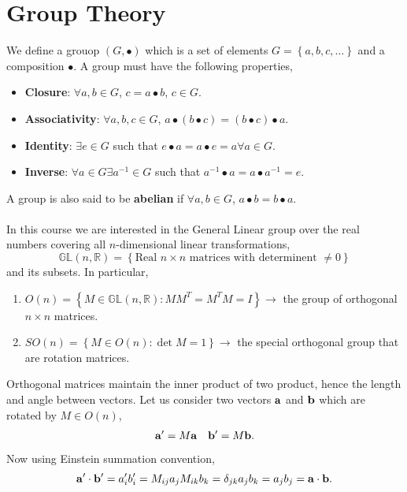 \documentclass{book}
\begin{document}
\section{Group Theory}
We define a grouop $(G, \bullet)$ which is a set of elements $G = \left\{a,b,c,\ldots\right\}$ and a composition $\bullet$. A group must have the following properties,
\begin{itemize}
	\item \textbf{Closure}: $\forall a,b \in G$, $c = a \bullet b$, $c \in G$.
	\item \textbf{Associativity}: $\forall a,b,c \in G$, $a \bullet(b \bullet c) = (b \bullet c) \bullet a$. 
	\item \textbf{Identity}: $\exists e \in G$ such that $e \bullet a = a \bullet e = a \forall a \in G$. 
	\item \textbf{Inverse}: $\forall a \in G \exists a^{-1} \in G$ such that $a^{-1}\bullet a = a \bullet a^{-1} = e$.
\end{itemize}
A group is also said to be \textbf{abelian} if $\forall a,b \in G$, $a\bullet b = b\bullet a$.
\\\\
In this course we are interested in the General Linear group over the real numbers covering all $n$-dimensional linear transformations,
\begin{equation}
	\mathbb{GL}(n, \mathbb{R}) = \left\{\text{Real $n\times n$ matrices with determinent $\neq 0$}\right\}
\end{equation}
and its subsets. In particular,
\begin{enumerate}
	\item $O(n) = \left\{M \in \mathbb{GL}(n, \mathbb{\mathbb{R}}) : MM^T = M^TM = I\right\} \to$ the group of orthogonal $n\times n$ matrices.
	\item $SO(n) = \left\{M \in O(n) : \det M = 1\right\} \to $ the special orthogonal group that are rotation matrices.
\end{enumerate}
Orthogonal matrices maintain the inner product of two product, hence the length and angle between vectors. Let us consider two vectors $\vb{a}$ and $\vb{b}$ which are rotated by $M \in O(n)$,
\begin{align}
	\vb{a}' = M\vb{a} && \vb{b}' = M\vb{b}.
\end{align}
Now using Einstein summation convention,
\begin{equation}
	\vb{a}' \cdot \vb{b}' = a_i'b_i' = M_{ij}a_jM_{ik}b_k = \delta_{jk}a_jb_k = a_jb_j = \vb{a} \cdot \vb{b}.
\end{equation}
\end{document}
